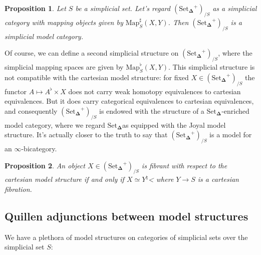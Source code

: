 \documentclass[12pt]{amsart}
\newcommand{\8}{\ensuremath{\infty}}
\newcommand{\SSet}{\ensuremath{\text{Set}_{\boldsymbol{\Delta}}}}
\newcommand{\Map}{\ensuremath{\text{Map}}}
\newtheorem{proposition}{Proposition}
\begin{document}
\begin{proposition}
  Let $S$ be a simplicial set. Let's regard $(\SSet^+)_{/S}$ as a simplicial category with mapping objects given by $\Map^\sharp_S(X, Y)$. Then $(\SSet^+)_{/S}$ is a simplicial model category.
\end{proposition}

Of course, we can define a second simplicial structure on $(\SSet^+)_{/S}$, where the simplicial mapping spaces are given by $\Map^\flat_S(X, Y)$. This simplicial structure is not compatible with the cartesian model structure: for fixed $X \in (\SSet^+)_{/S}$ the functor $A\mapsto A^\flat\times X$ does not carry weak homotopy equivalences to cartesian equivalences. But it does carry categorical equivalences to cartesian equivalences, and consequently $(\SSet^+)_{/S}$ is endowed with the structure of a \SSet-enriched model category, where we regard \SSet as equipped with the Joyal model structure. It's actually closer to the truth to say that $(\SSet^+)_{/S}$ is a model for an \8-bicategory.


\begin{proposition}
  An object $X \in (\SSet^+)_{/S}$ is fibrant with respect to the cartesian model structure if and only if $X\simeq Y^\natural$< where $Y \rightarrow S$ is a cartesian fibration.
\end{proposition}

\subsection{Quillen adjunctions between model structures}

We have a plethora of model structures on categories of simplicial sets over the simplicial set $S$:
\end{document}
